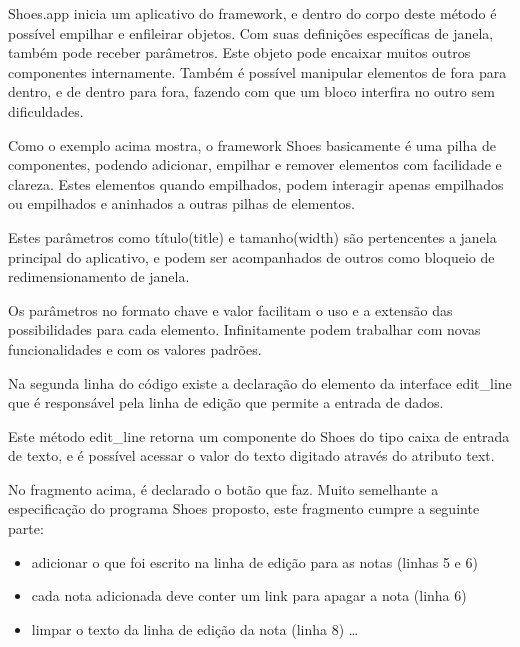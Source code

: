 \documentclass[espaco=simples,appendix=Name]{abnt}
\begin{document}
Shoes.app inicia um aplicativo do framework, e dentro do corpo deste método é possível empilhar e enfileirar objetos. Com suas definições específicas de janela, também pode receber parâmetros. Este objeto pode encaixar muitos outros componentes internamente. Também é possível manipular elementos de fora para dentro, e de dentro para fora, fazendo com que um bloco interfira no outro sem dificuldades.

Como o exemplo acima mostra, o framework Shoes basicamente é uma pilha de componentes, podendo adicionar, empilhar e remover elementos com facilidade e clareza. Estes elementos quando empilhados, podem interagir apenas empilhados ou empilhados e aninhados a outras pilhas de elementos. 


 

Estes parâmetros como título(title) e tamanho(width) são pertencentes a janela principal do aplicativo, e podem ser acompanhados de outros como bloqueio de redimensionamento de janela.

Os parâmetros no formato chave e valor facilitam o uso e a extensão das possibilidades para cada elemento. Infinitamente podem trabalhar com novas funcionalidades e com os valores padrões.

Na segunda linha do código existe a declaração do elemento da interface edit\_line que é responsável pela linha de edição que permite a entrada de dados.
 

Este método edit\_line retorna um componente do Shoes do tipo caixa de entrada de texto, e é possível acessar o valor do texto digitado através do atributo text. 

 

No fragmento acima, é declarado o botão que faz. Muito semelhante a especificação do programa Shoes proposto, este fragmento cumpre a seguinte parte: 

\begin{itemize} 
  \item adicionar o que foi escrito na linha de edição para as notas (linhas 5 e 6)
  \item cada nota adicionada deve conter um link para apagar a nota (linha 6)
  \item limpar o texto da linha de edição da nota (linha 8) \ldots
\end{itemize} 
\end{document}

